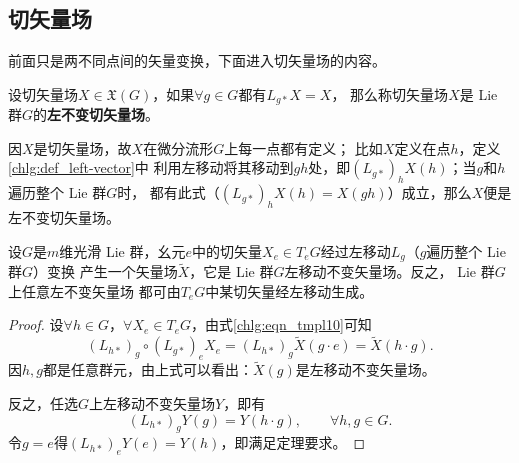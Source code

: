 \subsection{切矢量场}
前面只是两不同点间的矢量变换，下面进入切矢量场的内容。
\begin{definition}\label{chlg:def_left-vector}
    设切矢量场$X\in \mathfrak{X}(G)$，如果$\forall g\in G$都有$L_{g*}X=X$，
    那么称切矢量场$X$是 Lie 群$G$的\textbf{左不变切矢量场}。
\end{definition}
因$X$是切矢量场，故$X$在微分流形$G$上每一点都有定义；
比如$X$定义在点$h$，定义\ref{chlg:def_left-vector}中
利用左移动将其移动到$gh$处，即$(L_{g*})_h X(h)$；当$g$和$h$遍历整个 Lie 群$G$时，
都有此式（$(L_{g*})_h X(h)=X(gh)$）成立，那么$X$便是左不变切矢量场。



\begin{theorem}\label{chlg:thm_lfv}
设$G$是$m$维光滑 Lie 群，幺元$e$中的切矢量$X_e\in T_eG$经过左移动$L_g$（$g$遍历整个 Lie 群$G$）变换
产生一个矢量场$\widetilde{X}$，它是 Lie 群$G$左移动不变矢量场。反之， Lie 群$G$上任意左不变矢量场
都可由$T_eG$中某切矢量经左移动生成。
\end{theorem}
\begin{proof}
    设$\forall h\in G$，$\forall X_e\in T_eG$，由式\eqref{chlg:eqn_tmpl10}可知
    \begin{equation}
       (L_{h*})_g  \circ (L_{g*})_e  X_e = 
        (L_{h*})_g \widetilde{X}(g\cdot e) =\widetilde{X}(h \cdot g) .
    \end{equation}
    因$h,g$都是任意群元，由上式可以看出：$\widetilde{X}(g)$是左移动不变矢量场。
    
    反之，任选$G$上左移动不变矢量场${Y}$，即有
    \begin{equation}
       (L_{h*})_g {Y}(g) ={Y}(h \cdot g),\qquad \forall h,g\in G .
    \end{equation}
    令$g=e$得$(L_{h*})_e {Y}(e) ={Y}(h)$，即满足定理要求。
\end{proof}

